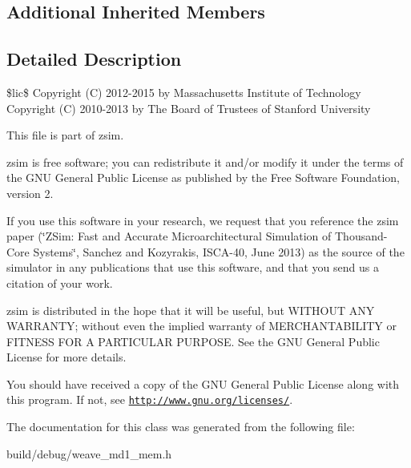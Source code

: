 \subsection*{Additional Inherited Members}


\subsection{Detailed Description}
\$lic\$ Copyright (C) 2012-\/2015 by Massachusetts Institute of Technology Copyright (C) 2010-\/2013 by The Board of Trustees of Stanford University

This file is part of zsim.

zsim is free software; you can redistribute it and/or modify it under the terms of the G\-N\-U General Public License as published by the Free Software Foundation, version 2.

If you use this software in your research, we request that you reference the zsim paper (\char`\"{}\-Z\-Sim\-: Fast and Accurate Microarchitectural Simulation of
\-Thousand-\/\-Core Systems\char`\"{}, Sanchez and Kozyrakis, I\-S\-C\-A-\/40, June 2013) as the source of the simulator in any publications that use this software, and that you send us a citation of your work.

zsim is distributed in the hope that it will be useful, but W\-I\-T\-H\-O\-U\-T A\-N\-Y W\-A\-R\-R\-A\-N\-T\-Y; without even the implied warranty of M\-E\-R\-C\-H\-A\-N\-T\-A\-B\-I\-L\-I\-T\-Y or F\-I\-T\-N\-E\-S\-S F\-O\-R A P\-A\-R\-T\-I\-C\-U\-L\-A\-R P\-U\-R\-P\-O\-S\-E. See the G\-N\-U General Public License for more details.

You should have received a copy of the G\-N\-U General Public License along with this program. If not, see \href{http://www.gnu.org/licenses/}{\tt http\-://www.\-gnu.\-org/licenses/}. 

The documentation for this class was generated from the following file\-:\begin{DoxyCompactItemize}
\item 
build/debug/weave\-\_\-md1\-\_\-mem.\-h\end{DoxyCompactItemize}
